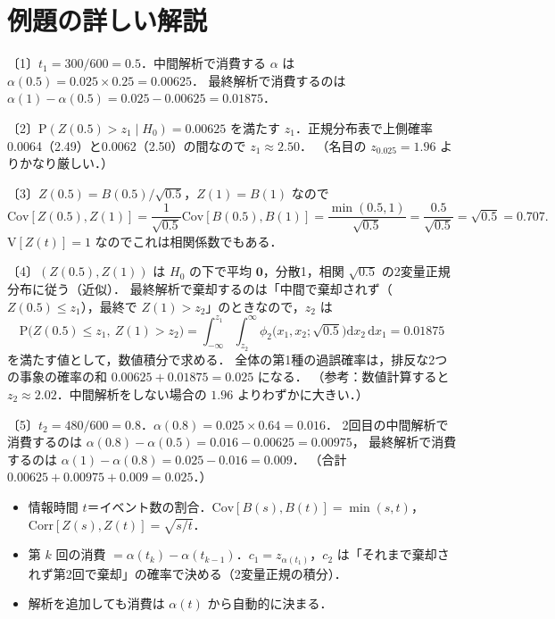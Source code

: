 \documentclass[a4paper,11pt,openany]{ltjsbook}
\newenvironment{kaitou}[1]{%
  \par\medskip\noindent
  \begin{tcolorbox}[enhanced,breakable,colback=bkgray!3,colframe=bkgray!60,boxrule=0.4pt,
    left=4pt,right=4pt,top=2pt,bottom=2pt,arc=1pt,
    title={\cref{#1}の解答},fonttitle=\bfseries\small,coltitle=white,colbacktitle=bkgray!80]}%
  {\end{tcolorbox}\par}
\newcommand{\V}{\mathrm{V}}
\newcommand{\Cov}{\mathrm{Cov}}
\newcommand{\Corr}{\mathrm{Corr}}
\newcommand{\Prob}{\mathrm{P}}
\newcommand{\dd}{\mathrm{d}}
\begin{document}
\section{例題の詳しい解説}\label{sec:m09-kaisetsu}
\begin{kaitou}{reidai:m09-1}
〔1〕$t_1=300/600=0.5$．中間解析で消費する $\alpha$ は $\alpha(0.5)=0.025\times0.25=0.00625$．
最終解析で消費するのは $\alpha(1)-\alpha(0.5)=0.025-0.00625=0.01875$．

〔2〕$\Prob(Z(0.5)>z_1\mid H_0)=0.00625$ を満たす $z_1$．正規分布表で上側確率0.0064（2.49）と0.0062（2.50）の間なので $z_1\approx2.50$．
（名目の $z_{0.025}=1.96$ よりかなり厳しい．）

〔3〕$Z(0.5)=B(0.5)/\sqrt{0.5}$，$Z(1)=B(1)$ なので
\[
\Cov[Z(0.5),Z(1)]=\frac{1}{\sqrt{0.5}}\Cov[B(0.5),B(1)]=\frac{\min(0.5,1)}{\sqrt{0.5}}=\frac{0.5}{\sqrt{0.5}}=\sqrt{0.5}=0.707 .
\]
$\V[Z(t)]=1$ なのでこれは相関係数でもある．

〔4〕$(Z(0.5),Z(1))$ は $H_0$ の下で平均 $\bm0$，分散1，相関 $\sqrt{0.5}$ の2変量正規分布に従う（近似）．
最終解析で棄却するのは「中間で棄却されず（$Z(0.5)\le z_1$），最終で $Z(1)>z_2$」のときなので，$z_2$ は
\[
\Prob\bigl(Z(0.5)\le z_1,\ Z(1)>z_2\bigr)=\int_{-\infty}^{z_1}\int_{z_2}^{\infty}\phi_2\bigl(x_1,x_2;\sqrt{0.5}\bigr)\dd x_2\,\dd x_1=0.01875
\]
を満たす値として，数値積分で求める．
全体の第1種の過誤確率は，排反な2つの事象の確率の和 $0.00625+0.01875=0.025$ になる．
（参考：数値計算すると $z_2\approx2.02$．中間解析をしない場合の $1.96$ よりわずかに大きい．）

〔5〕$t_2=480/600=0.8$．$\alpha(0.8)=0.025\times0.64=0.016$．
2回目の中間解析で消費するのは $\alpha(0.8)-\alpha(0.5)=0.016-0.00625=0.00975$，
最終解析で消費するのは $\alpha(1)-\alpha(0.8)=0.025-0.016=0.009$．
（合計 $0.00625+0.00975+0.009=0.025$．）
\end{kaitou}

\begin{summarybox}
\begin{itemize}
\item 情報時間 $t$＝イベント数の割合．$\Cov[B(s),B(t)]=\min(s,t)$，$\Corr[Z(s),Z(t)]=\sqrt{s/t}$．
\item 第 $k$ 回の消費 $=\alpha(t_k)-\alpha(t_{k-1})$．$c_1=z_{\alpha(t_1)}$，$c_2$ は「それまで棄却されず第2回で棄却」の確率で決める（2変量正規の積分）．
\item 解析を追加しても消費は $\alpha(t)$ から自動的に決まる．
\end{itemize}
\end{summarybox}
\end{document}
